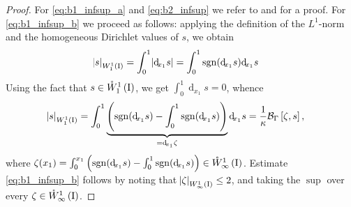\documentclass[final]{siamltex}
\begin{document}
\begin{proof}
For \eqref{eq:b1_infsup_a} and \eqref{eq:b2_infsup} we refer to \cite[Propositions
2.2-2.3]{PSaavedra_RScott_1991} and \cite{NGMeyers_1963} for a proof. For \eqref{eq:b1_infsup_b} we proceed as follows: 
applying the definition of the $L^1$-norm and the homogeneous Dirichlet values of $s$, we obtain
	\begin{align*}
		{\abs{{s}}_{{W^{{1}}_{{1}}\del{{\text{\rm I}}}}}} &= \int_0^1 \abs{{\operatorname{d}\!}_{x_1}s} = \int_0^1 {\operatorname{sgn}}({\operatorname{d}\!}_{x_1}s) {\operatorname{d}\!}_{x_1}s  
	\end{align*}
	Using the fact that $s\in {{\mathring{W}^{1}_{1}\del{{\text{\rm I}}}}}$, we get $\int_0^1 {\operatorname{d}\!}_{x_1} s  = 0$, whence 
	\begin{align*}	
	    {\abs{{s}}_{{W^{{1}}_{{1}}\del{{\text{\rm I}}}}}}
			&= \int_0^1 \underbrace{\del{{\operatorname{sgn}}({\operatorname{d}\!}_{x_1}s) - \int_0^1 {\operatorname{sgn}}({\operatorname{d}\!}_{x_1}s)}}_{={\operatorname{d}\!}_{x_1}\zeta} {\operatorname{d}\!}_{x_1}s 
			= \frac{1}{\kappa} {{\mathcal{B}}_\Gamma}\sbr{\zeta, s},  
	\end{align*}
where $\zeta(x_1) = \int_0^{x_1} \del{{\operatorname{sgn}}({\operatorname{d}\!}_{x_1}s) - \int_0^1{\operatorname{sgn}}({\operatorname{d}\!}_{x_1}s)} \in {{\mathring{W}^{1}_{\infty}\del{{\text{\rm I}}}}}$.  Estimate \eqref{eq:b1_infsup_b}  follows by noting that ${\abs{{\zeta}}_{{W^{{1}}_{{\infty}}\del{{\text{\rm I}}}}}} \leq 2$, and taking the $\sup$ over every $\zeta \in {{\mathring{W}^{1}_{\infty}\del{{\text{\rm I}}}}}$. 
\end{proof}
\end{document}
